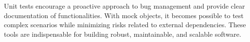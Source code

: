 \documentclass[12pt,a4paper]{article}
\begin{document}
Unit tests encourage a proactive approach to bug management and provide clear documentation of functionalities. With mock objects, it becomes possible to test complex scenarios while minimizing risks related to external dependencies. These tools are indispensable for building robust, maintainable, and scalable software.
\end{document}
